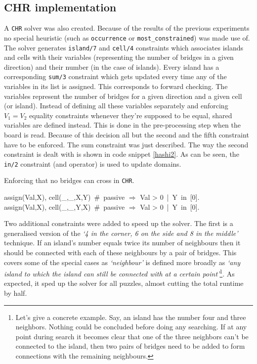 \subsection{CHR implementation}

A \texttt{CHR} solver was also created. Because of the results of the previous experiments no special heuristic (such as \texttt{occurrence} or \texttt{most\_constrained}) was made use of. The solver generates \texttt{island/7} and \texttt{cell/4} constraints which associates islands and cells with their variables (representing the number of bridges in a given direction) and their number (in the case of islands). Every island has a corresponding \texttt{sum/3} constraint which gets updated every time any of the variables in its list is assigned. This corresponds to forward checking. The variables represent the number of bridges for a given direction and a given cell (or island). Instead of defining all these variables separately and enforcing $V_1=V_2$ equality constraints whenever they're supposed to be equal, shared variables are defined instead. This is done in the pre-processing step when the board is read. Because of this decision all but the second and the fifth constraint have to be enforced. The sum constraint was just described. The way the second constraint is dealt with is shown in code snippet \ref{hashi2}. As can be seen, the \texttt{in/2} constraint (and operator) is used to update domains. 

\begin{snippet}[H]
\caption{Enforcing that no bridges can cross in \texttt{CHR}.}\label{hashi2}
\small
assign(Val,X), cell(\_,\_,X,Y)\ \#\ passive $\Longrightarrow$ Val > 0\ |\ Y\ in\ [0].\\
assign(Val,X), cell(\_,\_,Y,X)\ \#\ passive $\Longrightarrow$ Val > 0\ |\ Y\ in\ [0].
\end{snippet}

Two additional constraints were added to speed up the solver. The first is a generalised version of the \textit{`4 in the corner, 6 on the side and 8 in the middle'} technique. If an island's number equals twice its number of neighbours then it should be connected with each of these neighbours by a pair of bridges. This covers some of the special cases as \textit{`neighbour'} is defined more broadly as  \textit{`any island to which the island can still be connected with at a certain point'}\footnote{Let's give a concrete example. Say, an island has the number four and three neighbors. Nothing could be concluded before doing any searching. If at any point during search it becomes clear that one of the three neighbors can't be connected to the island, then two pairs of bridges need to be added to form connections with the remaining neighbours.}. As expected, it sped up the solver for all puzzles, almost cutting the total runtime by half.\\\par

